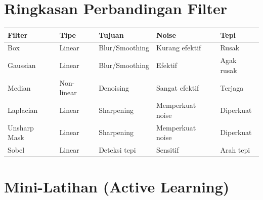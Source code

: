\documentclass[12pt,a4paper]{article}
\begin{document}
\section{Ringkasan Perbandingan Filter}

\begin{center}
\renewcommand{\arraystretch}{1.4}
\begin{tabular}{lllll}
\toprule
\textbf{Filter} & \textbf{Tipe} & \textbf{Tujuan} & \textbf{Noise} & \textbf{Tepi} \\
\midrule
Box          & Linear     & Blur/Smoothing     & Kurang efektif  & Rusak \\
Gaussian     & Linear     & Blur/Smoothing     & Efektif         & Agak rusak \\
Median       & Non-linear & Denoising          & Sangat efektif  & Terjaga \\
Laplacian    & Linear     & Sharpening         & Memperkuat noise & Diperkuat \\
Unsharp Mask & Linear     & Sharpening         & Memperkuat noise & Diperkuat \\
Sobel        & Linear     & Deteksi tepi       & Sensitif        & Arah tepi \\
\bottomrule
\end{tabular}
\end{center}

\section{Mini-Latihan (Active Learning)}
\end{document}
